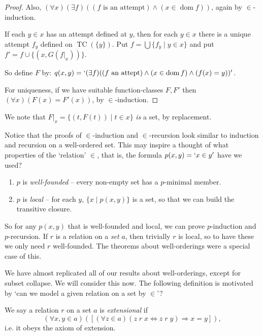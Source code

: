 \documentclass[a3paper, 10pt]{article}
\renewcommand{\vocab}[1]{\emph{#1}}
\newcommand{\dom}{\operatorname{dom}}
\begin{document}
\begin{multicols*}{5}
\begin{proof}
  Also, $(\forall x)(\exists f)((f \text{ is an attempt}) \land (x \in \dom f))$, again by $\in$-induction.

  If each $y \in x$ has an attempt defined at $y$, then for each $y \in x$ there is a unique attempt $f_y$ defined on $\operatorname{TC}(\{y\})$. Put $f = \bigcup\{f_y \mid y \in x\}$ and put $f' = f \cup \{(x, G(\left.f\right|_x))\}$.

  So define $F$ by: $q(x, y) = `(\exists f)((f\text{ an attept}) \land (x \in \dom f) \land (f(x) = y))'$.
  
  For uniqueness, if we have suitable function-classes $F, F'$ then $(\forall x)(F(x) = F'(x))$, by $\in$-induction.
\end{proof}

\begin{remark}
  We note that $\left.F\right|_x = \{(t, F(t)) \mid t \in x\}$ \emph{is} a set, by replacement.
\end{remark}

Notice that the proofs of $\in$-induction and $\in$-recursion look similar to induction and recursion on a well-ordered set. This may inspire a thought of what properties of the `relation' $\in$, that is, the formula $p(x, y) = `x \in y'$ have we used? 

\begin{enumerate}
  \item $p$ is \vocab{well-founded} -- every non-empty set has a $p$-minimal member.
  \item $p$ is \vocab{local} -- for each $y$, $\{x \mid p(x, y)\}$ is a set, so that we can build the transitive closure.
\end{enumerate}
So for any $p(x, y)$ that is well-founded and local, we can prove $p$-induction and $p$-recursion. If $r$ is a relation on a \emph{set} $a$, then trivially $r$ is local, so to have these we only need $r$ well-founded. The theorems about well-orderings were a special case of this.

We have almost replicated all of our results about well-orderings, except for subset collapse. We will consider this now. The following definition is motivated by `can we model a given relation on a set by $\in$'?

\begin{definition}[Extensional]
  We say a relation $r$ on a set $a$ is \vocab{extensional} if
  $$
  (\forall x, y \in a)([(\forall z \in a)(z\; r\; x \Leftrightarrow z\;r\;y) \Rightarrow x = y]),
  $$
  i.e. it obeys the axiom of extension.
\end{definition}


\end{multicols*}
\end{document}
